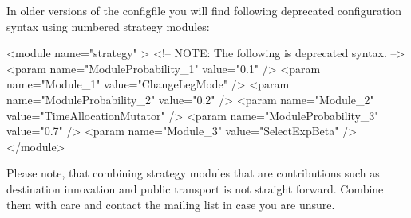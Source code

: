 In older versions of the \gls{configfile} you will find following deprecated configuration syntax using numbered strategy modules:
%
\begin{xml}
<module name="strategy" >
    <!-- NOTE: The following is deprecated syntax. -->
    <param name="ModuleProbability_1" value="0.1" /> 
    <param name="Module_1" value="ChangeLegMode" />
    <param name="ModuleProbability_2" value="0.2" />
    <param name="Module_2" value="TimeAllocationMutator" />
    <param name="ModuleProbability_3" value="0.7" />
    <param name="Module_3" value="SelectExpBeta" />
</module>
\end{xml}
%
%
%


Please note, that combining strategy modules that are \glspl{contribution} such as destination innovation and public transport is not straight forward. Combine them with care and contact the mailing list in case you are unsure.

%


